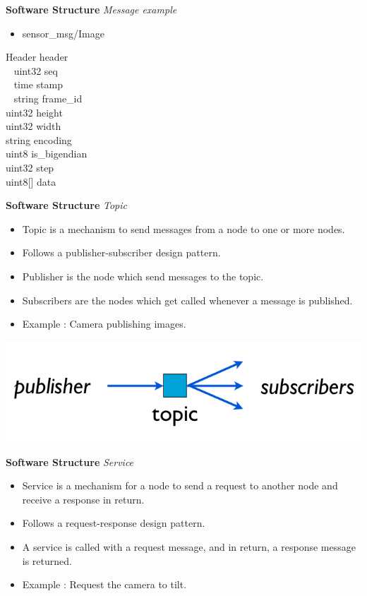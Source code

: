 \documentclass[a4paper, 11pt, conference]{ieeeconf}       %
\begin{document}
\textbf{Software Structure}
\textit{Message example}

\begin{itemize}
  \item sensor\_msg/Image
\end{itemize}

Header header \\
~  uint32 seq \\
~  time stamp \\
~  string frame\_id \\
uint32 height \\
uint32 width \\
string encoding \\
uint8 is\_bigendian \\
uint32 step \\
uint8[] data



\textbf{Software Structure}
\textit{Topic}

\begin{itemize}
  \item Topic is a mechanism to send messages from a node to one or more nodes.
  \item Follows a publisher-subscriber design pattern.
  \item Publisher is the node which send messages to the topic.
  \item Subscribers are the nodes which get called whenever a message is published.
  \item Example : Camera publishing images.
\end{itemize}

\begin{center}
  \includegraphics[width=.6\textwidth]{topic}
\end{center}




\textbf{Software Structure}
\textit{Service}

\begin{itemize}
  \item Service is a mechanism for a node to send a request to another node and receive a response in return.
  \item Follows a request-response design pattern.
  \item A service is called with a request message, and in return, a response message is returned.
  \item Example : Request the camera to tilt.
\end{itemize}
\end{document}
